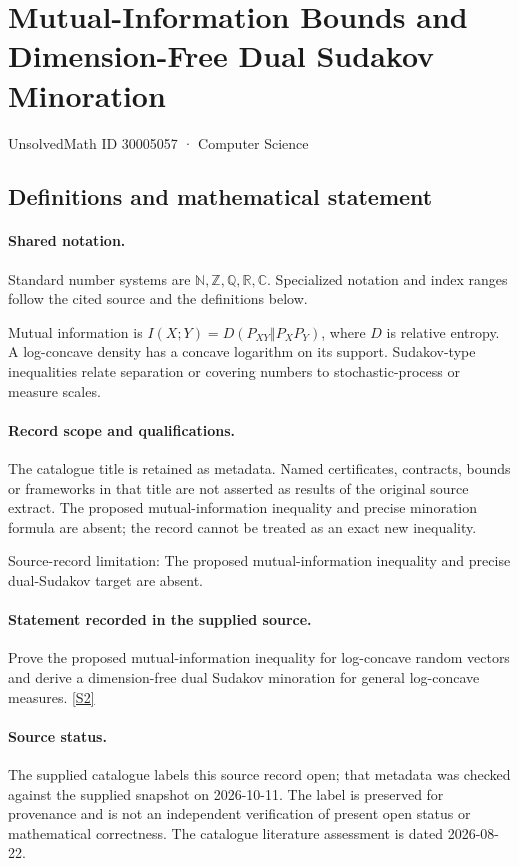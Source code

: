 \documentclass[11pt]{article}
\newcommand{\sref}[2]{\hyperlink{source:#1:#2}{[S#2]}}
\begin{document}
\setcounter{section}{30005056}
\section{Mutual-Information Bounds and Dimension-Free Dual Sudakov Minoration}\label{30005057}
{\small\sffamily UnsolvedMath ID 30005057 · Computer Science}
\subsection{Definitions and mathematical statement}

\paragraph{Shared notation.}Standard number systems are $\mathbb N,\mathbb Z,\mathbb Q,\mathbb R,\mathbb C$. Specialized notation and index ranges follow the cited source and the definitions below.


Mutual information is $I(X;Y)=D(P_{XY}\Vert P_XP_Y)$, where $D$ is relative entropy. A log-concave density has a concave logarithm on its support. Sudakov-type inequalities relate separation or covering numbers to stochastic-process or measure scales.
\paragraph{Record scope and qualifications.}
The catalogue title is retained as metadata. Named certificates, contracts, bounds or frameworks in that title are not asserted as results of the original source extract.
The proposed mutual-information inequality and precise minoration formula are absent; the record cannot be treated as an exact new inequality.

Source-record limitation: The proposed mutual-information inequality and precise dual-Sudakov target are absent.
\paragraph{Statement recorded in the supplied source.}
Prove the proposed mutual-information inequality for log-concave random vectors and derive a dimension-free dual Sudakov minoration for general log-concave measures. \sref{30005057}{2}
\paragraph{Source status.}
The supplied catalogue labels this source record open; that metadata was checked against the supplied snapshot on 2026-10-11. The label is preserved for provenance and is not an independent verification of present open status or mathematical correctness. The catalogue literature assessment is dated 2026-08-22.
\end{document}
